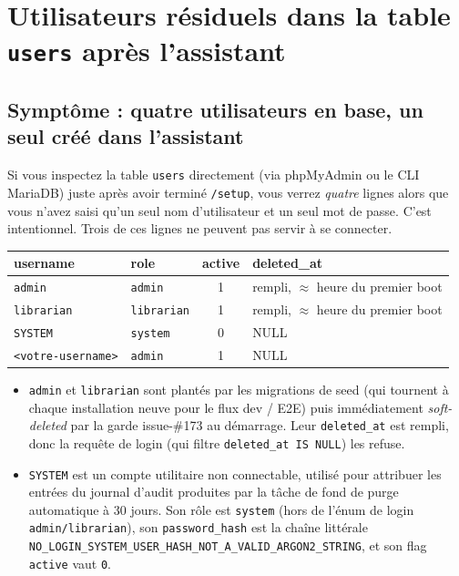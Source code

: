 \section{Utilisateurs résiduels dans la table \texttt{users} après l'assistant}
\label{sec:troubleshoot-seeded-users}

\subsection*{Symptôme : quatre utilisateurs en base, un seul créé dans l'assistant}

Si vous inspectez la table \texttt{users} directement (via
phpMyAdmin ou le CLI MariaDB) juste après avoir terminé
\texttt{/setup}, vous verrez \emph{quatre} lignes alors que vous
n'avez saisi qu'un seul nom d'utilisateur et un seul mot de passe.
C'est intentionnel. Trois de ces lignes ne peuvent pas servir à se
connecter.

\begin{longtable}{@{} l l c l @{}}
\toprule
\textbf{username} & \textbf{role} & \textbf{active} & \textbf{deleted\_at} \\
\midrule
\endhead
\texttt{admin}     & \texttt{admin}     & 1 & rempli, $\approx$ heure du premier boot \\
\texttt{librarian} & \texttt{librarian} & 1 & rempli, $\approx$ heure du premier boot \\
\texttt{SYSTEM}    & \texttt{system}    & 0 & NULL \\
\texttt{<votre-username>} & \texttt{admin} & 1 & NULL \\
\bottomrule
\end{longtable}

\begin{itemize}
  \item \texttt{admin} et \texttt{librarian} sont plantés par les
        migrations de seed (qui tournent à chaque installation neuve
        pour le flux dev / E2E) puis immédiatement
        \emph{soft-deleted} par la garde issue-\#173 au démarrage.
        Leur \texttt{deleted\_at} est rempli, donc la requête de
        login (qui filtre \texttt{deleted\_at IS NULL}) les refuse.
  \item \texttt{SYSTEM} est un compte
        utilitaire non connectable, utilisé pour attribuer les
        entrées du journal d'audit produites par la tâche de fond
        de purge automatique à 30 jours. Son rôle est \texttt{system}
        (hors de l'énum de login \texttt{admin/librarian}), son
        \texttt{password\_hash} est la chaîne littérale
        \texttt{NO\_LOGIN\_SYSTEM\_USER\_HASH\_NOT\_A\_VALID\_ARGON2\_STRING},
        et son flag \texttt{active} vaut \texttt{0}.
\end{itemize}


